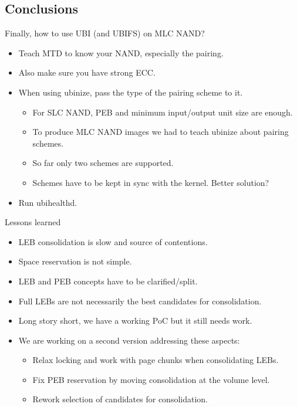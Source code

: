 \documentclass[aspectratio=169,obeyspaces,spaces,hyphens,dvipsnames]{beamer}
\begin{document}
\subsection{Conclusions}

\begin{frame}{Finally, how to use UBI (and UBIFS) on MLC NAND?}
  \begin{itemize}
  \item Teach MTD to know your NAND, especially the pairing.
  \item Also make sure you have strong ECC.
  \item When using ubinize, pass the type of the pairing scheme to it.
    \begin{itemize}
        \item For SLC NAND, PEB and minimum input/output unit size are enough.
        \item To produce MLC NAND images we had to teach ubinize about pairing schemes.
        \item So far only two schemes are supported.
        \item Schemes have to be kept in sync with the kernel. Better solution?
    \end{itemize}
  \item Run ubihealthd.
  \end{itemize}
\end{frame}

\begin{frame}{Lessons learned}
  \begin{itemize}
  \item LEB consolidation is slow and source of contentions.
  \item Space reservation is not simple.
  \item LEB and PEB concepts have to be clarified/split.
  \item Full LEBs are not necessarily the best candidates for
	consolidation.
  \item Long story short, we have a working PoC but it still needs work.
  \item We are working on a second version addressing these aspects:
    \begin{itemize}
    \item Relax locking and work with page chunks when consolidating LEBs.
    \item Fix PEB reservation by moving consolidation at the volume level.
    \item Rework selection of candidates for consolidation.
    \end{itemize}
  \end{itemize}
\end{frame}
\end{document}
